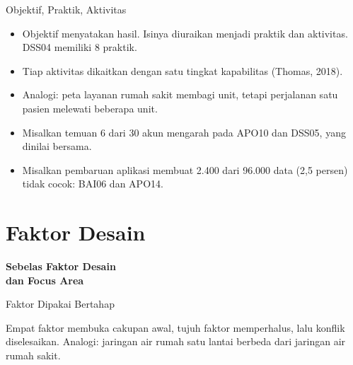 \documentclass[aspectratio=169, table, 12pt]{beamer}
\begin{document}
\begin{frame}{{\Large Objektif, Praktik, Aktivitas}}
  \vspace{4pt}
  \small
  \begin{itemize}
    \item Objektif menyatakan hasil. Isinya diuraikan menjadi praktik dan aktivitas. DSS04 memiliki 8 praktik.
    \item Tiap aktivitas dikaitkan dengan satu tingkat kapabilitas (Thomas, 2018).
    \item Analogi: peta layanan rumah sakit membagi unit, tetapi perjalanan satu pasien melewati beberapa unit.
    \item Misalkan temuan 6 dari 30 akun mengarah pada APO10 dan DSS05, yang dinilai bersama.
    \item Misalkan pembaruan aplikasi membuat 2.400 dari 96.000 data (2,5 persen) tidak cocok: BAI06 dan APO14.
  \end{itemize}
\end{frame}

\section{Faktor Desain}

\begin{frame}{\hfill}
  \centering
  \Huge{\textbf{Sebelas Faktor Desain\\dan Focus Area}}
\end{frame}

\begin{frame}{{\Large Faktor Dipakai Bertahap}}
  \centering
  \vspace{6pt}
  

  \vspace{8pt}
  \raggedright\small Empat faktor membuka cakupan awal, tujuh faktor memperhalus, lalu konflik diselesaikan. Analogi:
  jaringan air rumah satu lantai berbeda dari jaringan air rumah sakit.
\end{frame}
\end{document}
